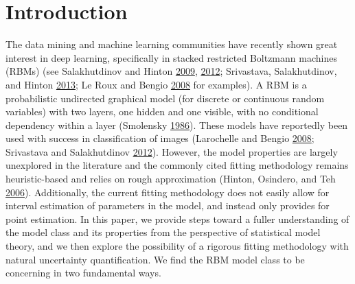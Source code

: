\documentclass[]{article}
\theoremstyle{definition}
\begin{document}
\hypertarget{introduction}{%
\section{Introduction}\label{introduction}}

The data mining and machine learning communities have recently shown
great interest in deep learning, specifically in stacked restricted
Boltzmann machines (RBMs) (see Salakhutdinov and Hinton
\protect\hyperlink{ref-salakhutdinov2009deep}{2009},
\protect\hyperlink{ref-salakhutdinov2012efficient}{2012}; Srivastava,
Salakhutdinov, and Hinton
\protect\hyperlink{ref-srivastava2013modeling}{2013}; Le Roux and Bengio
\protect\hyperlink{ref-le2008representational}{2008} for examples). A
RBM is a probabilistic undirected graphical model (for discrete or
continuous random variables) with two layers, one hidden and one
visible, with no conditional dependency within a layer (Smolensky
\protect\hyperlink{ref-smolensky1986information}{1986}). These models
have reportedly been used with success in classification of images
(Larochelle and Bengio
\protect\hyperlink{ref-larochelle2008classification}{2008}; Srivastava
and Salakhutdinov
\protect\hyperlink{ref-srivastava2012multimodal}{2012}). However, the
model properties are largely unexplored in the literature and the
commonly cited fitting methodology remains heuristic-based and relies on
rough approximation (Hinton, Osindero, and Teh
\protect\hyperlink{ref-hinton2006fast}{2006}). Additionally, the current
fitting methodology does not easily allow for interval estimation of
parameters in the model, and instead only provides for point estimation.
In this paper, we provide steps toward a fuller understanding of the
model class and its properties from the perspective of statistical model
theory, and we then explore the possibility of a rigorous fitting
methodology with natural uncertainty quantification. We find the RBM
model class to be concerning in two fundamental ways.
\end{document}
